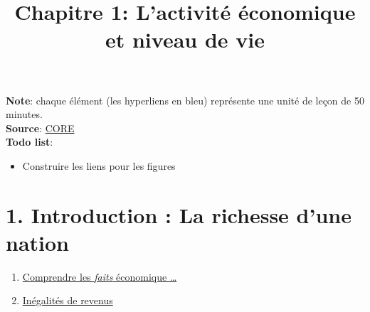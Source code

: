\documentclass[11pt]{amsart}
\title{Chapitre 1: L’activité économique et niveau de vie}
\author{}
\date{}
\begin{document}
\maketitle
\textbf{Note}: chaque élément (les hyperliens en bleu) représente une unité de leçon de 50 minutes. \\
\textbf{Source}: \href{https://www.core-econ.org/}{CORE} \\
\textbf{Todo list}:


\begin{itemize}

\item Construire les liens pour les figures

\end{itemize}


\hypertarget{x-1.-introduction-:-la-richesse-d’une-nation}{\section*{1. Introduction : La richesse d’une nation}}
\begin{enumerate}

\item{\href{https://www.core-econ.org/the-economy/book/fr/text/01.html}{Comprendre les \emph{faits} économique …​}}

\item{\href{https://www.core-econ.org/the-economy/book/fr/text/01.html#11-in%C3%A9galit%C3%A9s-de-revenus}{Inégalités de revenus}}

\end{enumerate}
\end{document}

